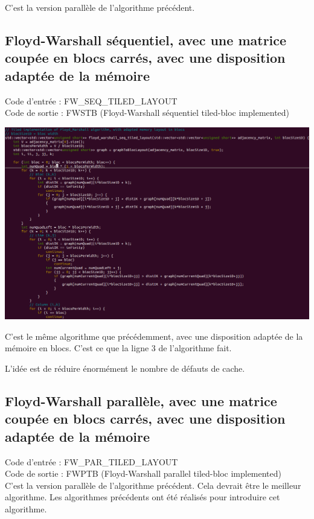\documentclass[a4paper,11pt]{article}
\begin{document}
C'est la version parallèle de l'algorithme précédent.

\subsection{Floyd-Warshall séquentiel, avec une matrice coupée en blocs carrés, avec une disposition adaptée de la mémoire}

\noindent Code d'entrée : FW\_SEQ\_TILED\_LAYOUT \\
Code de sortie : FWSTB (Floyd-Warshall séquentiel tiled-bloc implemented)

\begin{center}
  \includegraphics[scale=0.5]{FW_SEQ_TILED_LAYOUT.png}
\end{center}

C'est le même algorithme que précédemment, avec une disposition adaptée de la mémoire en blocs. C'est ce que la ligne 3 de l'algorithme fait.

L'idée est de réduire énormément le nombre de défauts de cache.

\subsection{Floyd-Warshall parallèle, avec une matrice coupée en blocs carrés, avec une disposition adaptée de la mémoire}

\noindent Code d'entrée : FW\_PAR\_TILED\_LAYOUT \\
Code de sortie : FWPTB (Floyd-Warshall parallel tiled-bloc implemented)\\

C'est la version parallèle de l'algorithme précédent. Cela devrait être le meilleur algorithme. Les algorithmes précédents ont été réalisés pour introduire cet algorithme.
\end{document}
